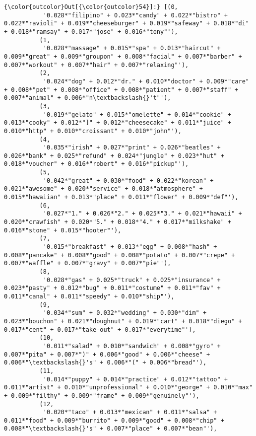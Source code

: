 \documentclass[11pt]{article}
\begin{document}
\begin{Verbatim}[commandchars=\\\{\}]
{\color{outcolor}Out[{\color{outcolor}54}]:} [(0,
           '0.028*"filipino" + 0.023*"candy" + 0.022*"bistro" + 0.022*"ravioli" + 0.019*"cheeseburger" + 0.019*"safeway" + 0.018*"di" + 0.018*"ramsay" + 0.017*"jose" + 0.016*"tony"'),
          (1,
           '0.028*"massage" + 0.015*"spa" + 0.013*"haircut" + 0.009*"great" + 0.009*"groupon" + 0.008*"facial" + 0.007*"barber" + 0.007*"workout" + 0.007*"hair" + 0.007*"relaxing"'),
          (2,
           '0.024*"dog" + 0.012*"dr." + 0.010*"doctor" + 0.009*"care" + 0.008*"pet" + 0.008*"office" + 0.008*"patient" + 0.007*"staff" + 0.007*"animal" + 0.006*"n\textbackslash{}'t"'),
          (3,
           '0.019*"gelato" + 0.015*"omelette" + 0.014*"cookie" + 0.013*"cooky" + 0.012*"]" + 0.012*"cheesecake" + 0.011*"juice" + 0.010*"http" + 0.010*"croissant" + 0.010*"john"'),
          (4,
           '0.035*"irish" + 0.027*"print" + 0.026*"beatles" + 0.026*"bank" + 0.025*"refund" + 0.024*"jungle" + 0.023*"hut" + 0.018*"voucher" + 0.016*"robert" + 0.016*"pickup"'),
          (5,
           '0.042*"great" + 0.030*"food" + 0.022*"korean" + 0.021*"awesome" + 0.020*"service" + 0.018*"atmosphere" + 0.015*"hawaiian" + 0.013*"place" + 0.011*"flower" + 0.009*"def"'),
          (6,
           '0.027*"1." + 0.026*"2." + 0.025*"3." + 0.021*"hawaii" + 0.020*"crawfish" + 0.020*"5." + 0.018*"4." + 0.017*"milkshake" + 0.016*"stone" + 0.015*"hooter"'),
          (7,
           '0.015*"breakfast" + 0.013*"egg" + 0.008*"hash" + 0.008*"pancake" + 0.008*"good" + 0.008*"potato" + 0.007*"crepe" + 0.007*"waffle" + 0.007*"gravy" + 0.007*"pie"'),
          (8,
           '0.028*"gas" + 0.025*"truck" + 0.025*"insurance" + 0.023*"pasty" + 0.012*"bug" + 0.011*"costume" + 0.011*"fav" + 0.011*"canal" + 0.011*"speedy" + 0.010*"ship"'),
          (9,
           '0.034*"sum" + 0.032*"wedding" + 0.030*"dim" + 0.023*"bouchon" + 0.021*"doughnut" + 0.019*"cart" + 0.018*"diego" + 0.017*"cent" + 0.017*"take-out" + 0.017*"everytime"'),
          (10,
           '0.011*"salad" + 0.010*"sandwich" + 0.008*"gyro" + 0.007*"pita" + 0.007*")" + 0.006*"good" + 0.006*"cheese" + 0.006*"\textbackslash{}'s" + 0.006*"(" + 0.006*"bread"'),
          (11,
           '0.014*"puppy" + 0.014*"practice" + 0.012*"tattoo" + 0.011*"artist" + 0.010*"unprofessional" + 0.010*"george" + 0.010*"max" + 0.009*"filthy" + 0.009*"frame" + 0.009*"genuinely"'),
          (12,
           '0.020*"taco" + 0.013*"mexican" + 0.011*"salsa" + 0.011*"food" + 0.009*"burrito" + 0.009*"good" + 0.008*"chip" + 0.008*"\textbackslash{}'s" + 0.007*"place" + 0.007*"bean"'),

\end{Verbatim}
\end{document}
